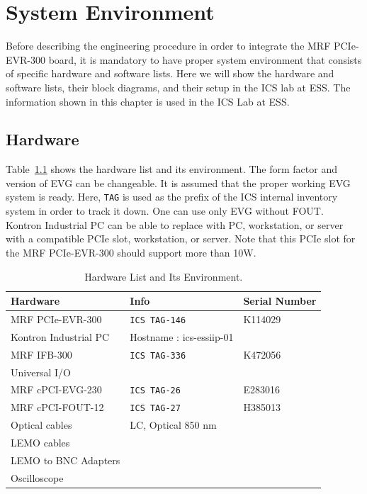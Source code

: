 \documentclass[11pt
  , a4paper
  , article
  , oneside
  , showtrims
]{memoir}
\begin{document}
\clearpage

\chapter{System Environment}
Before describing the engineering procedure in order to integrate the MRF PCIe-EVR-300 board, it is mandatory to have proper system environment that consists of specific hardware and software lists. Here we will show the hardware and software lists, their block diagrams, and their setup in the ICS lab at ESS. The information shown in this chapter is used in the ICS Lab at ESS.


\section{Hardware}
Table~\ref{table:hwlist} shows the hardware list and its environment. The form factor and version of EVG can be changeable. It is assumed that the proper working EVG system is ready. Here, \texttt{TAG} is used as the prefix of the ICS internal inventory system in order to track it down. One can use only EVG without FOUT. Kontron Industrial PC can be able to replace with PC, workstation, or server with a compatible PCIe slot, workstation, or server. Note that this PCIe slot for the MRF PCIe-EVR-300 should support more than 10W.
\begin{table}[!hb]
  \centering
  \begin{tabular}{l|l|l}
    \toprule
    Hardware                  & Info                   & Serial Number \\
    \midrule
    MRF PCIe-EVR-300          & \texttt{ICS TAG-146}   & K114029\\\midrule
    Kontron Industrial PC     & Hostname : ics-essiip-01          & \\\midrule
    MRF IFB-300               & \texttt{ICS TAG-336}   & K472056  \\\midrule
    Universal I/O             &                        &          \\\midrule
    MRF cPCI-EVG-230          & \texttt{ICS TAG-26}    & E283016  \\\midrule
    MRF cPCI-FOUT-12          & \texttt{ICS TAG-27}    & H385013 \\\midrule
    Optical cables            & LC, Optical 850 nm     & \\\midrule
    LEMO cables               &                        & \\\midrule
    LEMO to BNC Adapters      &                        & \\\midrule
    Oscilloscope              &                        & \\\bottomrule
  \end{tabular}
  \caption[]{Hardware List and Its Environment.}
  \label{table:hwlist}
\end{table}
\end{document}

